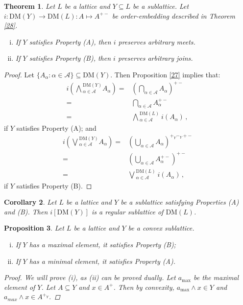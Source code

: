 \documentclass[12pt,a4paper]{amsart}
\numberwithin{equation}{section}
\newtheorem{thm}{Theorem}
\newtheorem{cor}[thm]{Corollary}
\newtheorem{prop}[thm]{Proposition}
\theoremstyle{definition}
\newcommand{\DM}{\text{DM}}
\begin{document}
\begin{thm}\label{30}
	Let $L$ be a lattice and $Y \subseteq L$ be a sublattice.  Let $i:\DM(Y)\to \DM(L):A\mapsto A^{+-}$ be order-embedding described in Theorem \ref{28}.
	\begin{enumerate}[(i)]
		\item  If $Y$ satisfies Property (A), then $i$ preserves arbitrary meets.
\item If $Y$ satisfies Property (B), then $i$ preserves arbitrary joins.
	\end{enumerate}
\end{thm}
\begin{proof}
Let $\{A_{\alpha}: \alpha \in \mathcal{A} \} \subseteq \DM(Y)$.    Then Proposition \ref{27} implies that:
\begin{align*}
  i\left(\bigwedge{}^{\!\DM(Y)}_{\alpha\in\mathcal A}A_\alpha\right)= &  \left(\bigcap_{\alpha \in \mathcal{A}} A_{\alpha}\right)^{+-} \\
  = &\bigcap_{\alpha \in \mathcal{A}} A_{\alpha}^{+-} \\
  = &\bigwedge{}^{\!\DM(L)}_{\alpha\in\mathcal A}\ i(A_\alpha)\,,
\end{align*}
if $Y$ satisfies Property (A); and
\begin{align*}
  i\left(\bigvee{}^{\!\DM(Y)}_{\alpha\in\mathcal A} A_\alpha\right) =&\left (\bigcup_{\alpha \in \mathcal{A}} A_{\alpha}\right)^{+_{Y}-_{Y}+-}  \\
  = & \left(\bigcup_{\alpha \in \mathcal{A}} A_{\alpha}^{+-}\right)^{+-} \\
  = & \bigvee{}^{\!\DM(L)}_{\alpha\in\mathcal A}\  i(A_\alpha)\,,
\end{align*}
if $Y$ satisfies Property (B).
\end{proof}

\begin{cor}\label{31}
Let $L$ be a lattice and $Y$ be a sublattice satisfying Properties (A) and (B). Then $i[\DM(Y)]$ is a regular sublattice of $\DM(L)$.
\end{cor}


\begin{prop}\label{32}
	Let $L$ be a lattice and $Y$ be a convex sublattice.
	\begin{enumerate}[(i)]
		\item If $Y$ has a maximal element, it satisfies Property (B);
		\item If $Y$ has a minimal element, it satisfies Property (A).
	\end{enumerate}
\begin{proof}
	We will prove (i), as (ii) can be proved dually. Let $a_{\max}$ be the maximal element of $Y$. Let $A \subseteq Y$ and $x \in A^{+}$. Then by convexity, $a_{\max} \wedge x \in Y$ and $a_{max} \wedge x \in A^{+_{Y}}$.
\end{proof}	
\end{prop}
\end{document}
